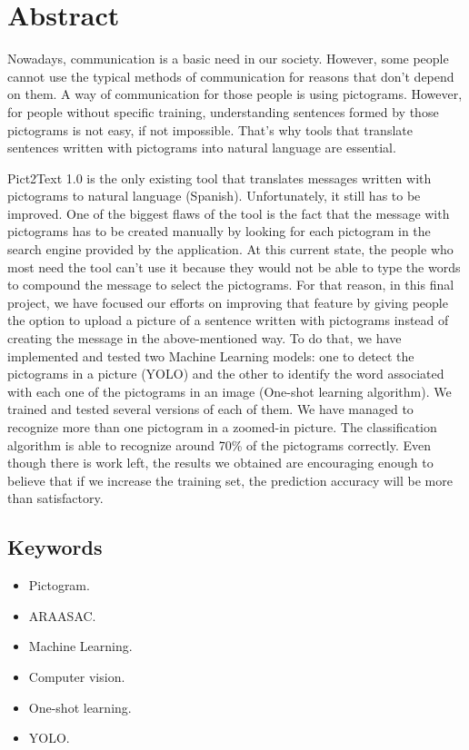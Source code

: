 
\chapter*{Abstract}

Nowadays, communication is a basic need in our society. However, some people cannot use the typical methods of communication for reasons that don't depend on them. A way of communication for those people is using pictograms. However, for people without specific training, understanding sentences formed by those pictograms is not easy, if not impossible. That's why tools that translate sentences written with pictograms into natural language are essential.

Pict2Text 1.0 is the only existing tool that translates messages written with pictograms to natural language (Spanish). Unfortunately, it still has to be improved. One of the biggest flaws of the tool is the fact that the message with pictograms has to be created manually by looking for each pictogram in the search engine provided by the application. At this current state, the people who most need the tool can't use it because they would not be able to type the words to compound the message to select the pictograms. For that reason, in this final project, we have focused our efforts on improving that feature by giving people the option to upload a picture of a sentence written with pictograms instead of creating the message in the above-mentioned way. To do that, we have implemented and tested two Machine Learning models: one to detect the pictograms in a picture (YOLO) and the other to identify the word associated with each one of the pictograms in an image (One-shot learning algorithm). We trained and tested several versions of each of them. We have managed to recognize more than one pictogram in a zoomed-in picture. The classification algorithm is able to recognize around 70\% of the pictograms correctly. Even though there is work left, the results we obtained are encouraging enough to believe that if we increase the training set, the prediction accuracy will be more than satisfactory.

\clearpage  

\section*{Keywords}

\begin{itemize}
    \item Pictogram.
    \item ARAASAC.
    \item Machine Learning.
    \item Computer vision.
    \item One-shot learning.
    \item YOLO.
\end{itemize}



   


   
